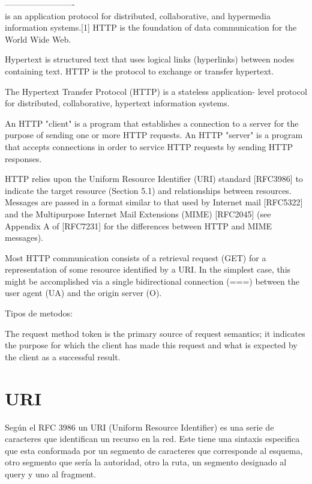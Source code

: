 \documentclass{article}
\begin{document}
-------------------------\\
is an application protocol for distributed, collaborative, and hypermedia information systems.[1] HTTP is the foundation of data communication for the World Wide Web.

Hypertext is structured text that uses logical links (hyperlinks) between nodes containing text. HTTP is the protocol to exchange or transfer hypertext.

 The Hypertext Transfer Protocol (HTTP) is a stateless application-
   level protocol for distributed, collaborative, hypertext information
   systems. 
   
  An HTTP "client" is a
   program that establishes a connection to a server for the purpose of
   sending one or more HTTP requests.  An HTTP "server" is a program
   that accepts connections in order to service HTTP requests by sending
   HTTP responses.
   
 HTTP relies upon the Uniform Resource Identifier (URI) standard
   [RFC3986] to indicate the target resource (Section 5.1) and
   relationships between resources.  Messages are passed in a format
   similar to that used by Internet mail [RFC5322] and the Multipurpose
   Internet Mail Extensions (MIME) [RFC2045] (see Appendix A of
   [RFC7231] for the differences between HTTP and MIME messages).

   Most HTTP communication consists of a retrieval request (GET) for a
   representation of some resource identified by a URI.  In the simplest
   case, this might be accomplished via a single bidirectional
   connection (===) between the user agent (UA) and the origin
   server (O).
   
Tipos de metodos:

 The request method token is the primary source of request semantics;
   it indicates the purpose for which the client has made this request
   and what is expected by the client as a successful result.
    
\section{URI}

Seg\'un el RFC 3986 un URI (Uniform Resource Identifier) es una serie de caracteres que identifican un recurso en la red. Este tiene una sintaxis especifica que esta conformada por un segmento de caracteres que corresponde al esquema, otro segmento que ser\'ia la autoridad, otro la ruta, un segmento designado al query y uno al fragment.\\
\end{document}
